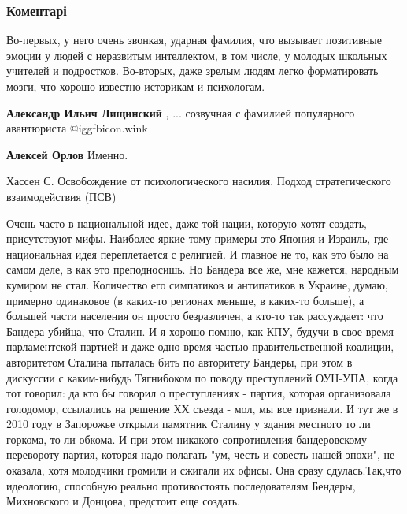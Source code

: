  
 
 
 
 
\subsubsection{Коментарі}
\label{sec:21_10_2021.fb.karevin_aleksandr.1.batjko_bandera.cmt}

\begin{itemize} %

Во-первых, у него очень звонкая, ударная фамилия, что вызывает позитивные
эмоции у людей с неразвитым интеллектом, в том числе, у молодых школьных
учителей и подростков. Во-вторых, даже зрелым людям легко форматировать мозги,
что хорошо известно историкам и психологам.

\begin{itemize} %
\textbf{Александр Ильич Лищинский} , ... созвучная с фамилией популярного авантюриста  @igg{fbicon.wink} 

\textbf{Алексей Орлов} Именно.
\end{itemize} %


Хассен С. Освобождение от психологического насилия. Подход стратегического
взаимодействия (ПСВ)


Очень часто в национальной идее, даже той нации, которую хотят создать,
присутствуют мифы. Наиболее яркие тому примеры это Япония и Израиль, где
национальная идея переплетается с религией. И главное не то, как это было на
самом деле, в как это преподносишь. Но Бандера все же, мне кажется, народным
кумиром не стал. Количество его симпатиков и антипатиков в Украине, думаю,
примерно одинаковое (в каких-то регионах меньше, в каких-то больше), а большей
части населения он просто безразличен, а кто-то так рассуждает: что Бандера
убийца, что Сталин. И я хорошо помню, как КПУ, будучи в свое время
парламентской партией и даже одно время частью правительственной коалиции,
авторитетом Сталина пыталась бить по авторитету Бандеры, при этом в дискуссии с
каким-нибудь Тягнибоком по поводу преступлений ОУН-УПА, когда тот говорил: да
кто бы говорил о преступлениях - партия, которая организовала голодомор,
ссылались на решение ХХ съезда - мол, мы все признали. И тут же в 2010 году в
Запорожье открыли памятник Сталину у здания местного то ли горкома, то ли
обкома. И при этом никакого сопротивления бандеровскому перевороту партия,
которая надо полагать "ум, честь и совесть нашей эпохи", не оказала, хотя
молодчики громили и сжигали их офисы. Она сразу сдулась.Так,что идеологию,
способную реально противостоять последователям Бендеры, Михновского и Донцова,
предстоит еще создать.


\end{itemize}
